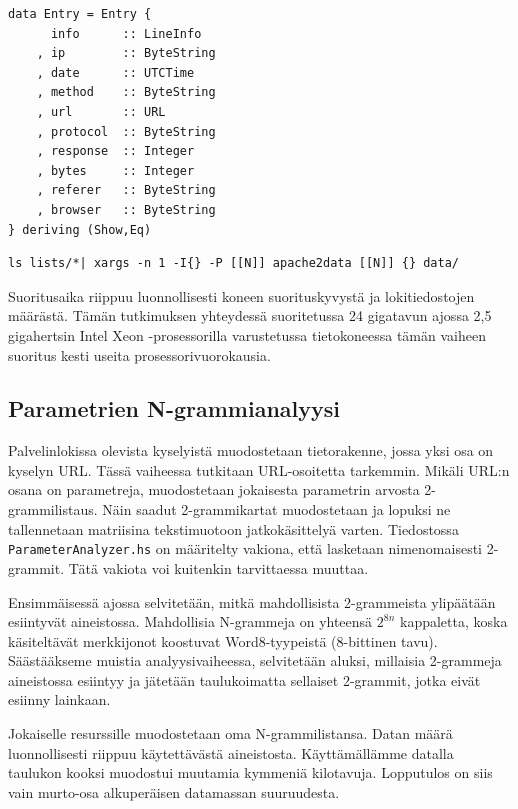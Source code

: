 \begin{lstlisting}[float=h,caption=Yhden lokirivin säilövä tietorakenne.,label=entry,aboveskip=1cm]
data Entry = Entry {
      info      :: LineInfo
    , ip        :: ByteString
    , date      :: UTCTime
    , method    :: ByteString
    , url       :: URL
    , protocol  :: ByteString
    , response  :: Integer
    , bytes     :: Integer
    , referer   :: ByteString
    , browser   :: ByteString
} deriving (Show,Eq)
\end{lstlisting}

\begin{lstlisting}[float=h,language=bashshell,label=a2d,caption=Muuntaminen
  tietorakenteeksi.]
ls lists/*| xargs -n 1 -I{} -P [[N]] apache2data [[N]] {} data/
\end{lstlisting}

Suoritusaika riippuu luonnollisesti koneen suorituskyvystä ja
lokitiedostojen määrästä. Tämän tutkimuksen yhteydessä suoritetussa 24
gigatavun ajossa 2,5 gigahertsin Intel Xeon -prosessorilla varustetussa
tietokoneessa tämän vaiheen suoritus kesti useita
prosessorivuorokausia.

\subsection{Parametrien N-grammianalyysi}

Palvelinlokissa olevista kyselyistä muodostetaan tietorakenne, jossa
yksi osa on kyselyn URL. Tässä vaiheessa tutkitaan URL-osoitetta
tarkemmin. Mikäli URL:n osana on parametreja, muodostetaan jokaisesta
parametrin arvosta 2-grammilistaus. Näin saadut 2-grammikartat
muodostetaan ja lopuksi ne tallennetaan matriisina tekstimuotoon
jatkokäsittelyä varten. Tiedostossa \texttt{ParameterAnalyzer.hs} on
määritelty vakiona, että lasketaan nimenomaisesti 2-grammit. Tätä
vakiota voi kuitenkin tarvittaessa muuttaa.

Ensimmäisessä ajossa selvitetään, mitkä mahdollisista 2-grammeista
ylipäätään esiintyvät aineistossa. Mahdollisia N-grammeja on yhteensä
$2^{8n}$ kappaletta, koska käsiteltävät merkkijonot koostuvat
Word8-tyypeistä (8-bittinen tavu). Säästääkseme muistia
analyysivaiheessa, selvitetään aluksi, millaisia 2-grammeja
aineistossa esiintyy ja jätetään taulukoimatta sellaiset 2-grammit,
jotka eivät esiinny lainkaan.

Jokaiselle resurssille muodostetaan oma N-grammilistansa. Datan määrä
luonnollisesti riippuu käytettävästä aineistosta. Käyttämällämme
datalla taulukon kooksi muodostui muutamia kymmeniä kilotavuja.
Lopputulos on siis vain murto-osa alkuperäisen datamassan
suuruudesta.

